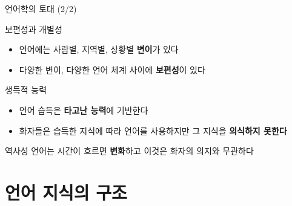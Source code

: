 \documentclass[11pt, aspectratio=169]{beamer}
\begin{document}
\begin{frame}[t]{언어학의 토대 (2/2)}
  \begin{block}{보편성과 개별성}
    \begin{itemize}
      \item 언어에는 사람별, 지역별, 상황별 \textbf{변이}가 있다
      \item 다양한 변이, 다양한 언어 체계 사이에 \textbf{보편성}이 있다
    \end{itemize}    
  \end{block}
  \begin{block}{생득적 능력}
    \begin{itemize}
      \item 언어 습득은 \textbf{타고난 능력}에 기반한다
      \item 화자들은 습득한 지식에 따라 언어를 사용하지만 그 지식을 \textbf{의식하지 못한다}
    \end{itemize}    
  \end{block}
  \begin{block}{역사성}
    언어는 시간이 흐르면 \textbf{변화}하고 이것은 화자의 의지와 무관하다
  \end{block}
\end{frame}

\section{언어 지식의 구조}
\end{document}
